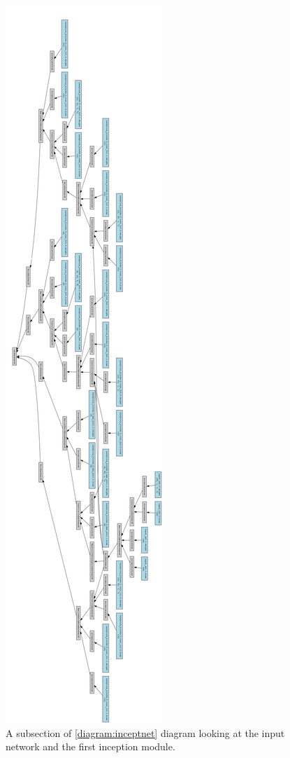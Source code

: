 \begin{figure}
    \centering
    \includegraphics[width=\paperwidth, height=\textheight, keepaspectratio]{images/graph-input.png}
    \caption{A subsection of \ref{diagram:inceptnet} diagram looking at the input network and the first inception module.}
    \label{diagram:inceptnet-in}
\end{figure}

